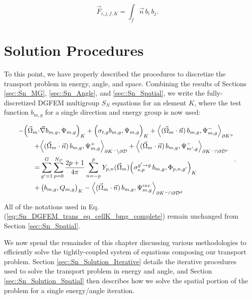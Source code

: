 \begin{equation}
\label{eq::Sn_surface_matrix_entry}
\vec{{ F}}_{i,j,f,K} =  \int_f \vec{n} \, b_i \, b_j .
\end{equation}

\section{Solution Procedures}
\label{sec::Sn_Solution}

To this point, we have properly described the procedures to discretize the transport problem in energy, angle, and space. Combining the results of Sections \ref{sec::Sn_MG}, \ref{sec::Sn_Angle}, and \ref{sec::Sn_Spatial}, we write the fully-discretized DGFEM multigroup $S_N$ equations for an element $K$, where the test function $b_{m,g}$ for a single direction and energy group is now used:

\begin{equation}
\label{eq::Sn_DGFEM_trans_eq_cellK_bmg_complete}
\begin{aligned}
-  \Big( \vec{\Omega}_m \cdot  & \vec{\nabla} b_{m,g}, \Psi_{m,g} \Big)_{K}   + \Big(  \sigma_{t,g} b_{m,g} ,   \Psi_{m,g} \Big)_{K} +  \Big< ( \vec{\Omega}_m \cdot \vec{n} ) \, b_{m,g}, {\Psi}_{m,g}^{-}  \Big>_{\partial K^+}  \\
  + & \Big< ( \vec{\Omega}_m \cdot \vec{n} ) \, b_{m,g}, {\Psi}_{m,g}^{+}  \Big>_{\partial K^- \backslash \partial \mathcal{D}}  + \Big< ( \vec{\Omega}_m \cdot \vec{n} ) \, b_{m,g}, {\Psi}^{-}_{m',g}  \Big>_{\partial K^- \cap \partial \mathcal{D}^r}  \\
= & \sum\displaylimits_{g'=1}^G \sum_{p=0}^{N_P} \frac{2p + 1}{4 \pi} \sum_{n=-p}^{p}   Y_{p,n} (  \vec{\Omega}_m )  \Big( \sigma_{s,p}^{g' \rightarrow g} \, b_{m,g},  \Phi_{p,n,g'} \Big)_{K}  \\
+ & \left(  b_{m,g} ,   Q_{m,g} \right)_{K} - \Big< ( \vec{\Omega}_m \cdot \vec{n} ) \, b_{m,g}, {\Psi}_{m,g}^{inc}  \Big>_{\partial K^- \cap \partial \mathcal{D}^d}
\end{aligned} .
\end{equation} 

\noindent All of the notations used in Eq. (\ref{eq::Sn_DGFEM_trans_eq_cellK_bmg_complete}) remain unchanged from Section \ref{sec::Sn_Spatial}.

We now spend the remainder of this chapter discussing various methodologies to efficiently solve the tightly-coupled system of equations composing our transport problem. Section \ref{sec::Sn_Solution_Iterative} details the iterative procedures used to solve the transport problem in energy and angle, and Section \ref{sec::Sn_Solution_Spatial} then describes how we solve the spatial portion of the problem for a single energy/angle iteration.

